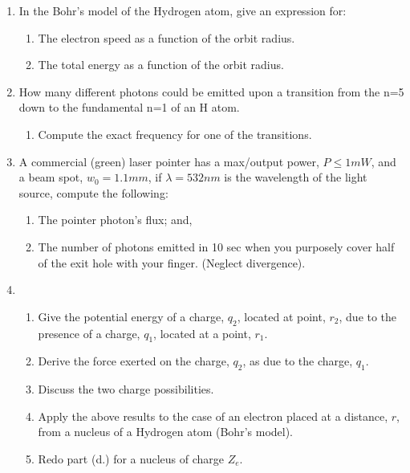 \documentclass[colorlinks,11pt,a4paper,normalphoto,withhyper,ragged2e]{altareport}
\begin{document}
	\begin{enumerate}[leftmargin=1cm]
		\item In the Bohr’s model of the Hydrogen atom, give an expression for: \\
		
		\begin{enumerate}
			\item The electron speed as a function of the orbit radius. \\
			\item The total energy as a function of the orbit radius. \\
		\end{enumerate}
		
		
		\item How many different photons could be emitted upon a transition from the n=5 down to the fundamental n=1 of an H atom. \\
		
		\begin{enumerate}
			\item Compute the exact frequency for one of the transitions. \\
		\end{enumerate}
		
		
		\item A commercial (green) laser pointer has a max/output power, $P \leq 1mW$, and a beam spot, $w_0 = 1.1mm$, if $\lambda = 532nm$ is the wavelength of the light source, compute the following: \\
		
		\begin{enumerate}
			\item The pointer photon’s flux; and,   \\
			\item The number of photons emitted in 10 sec when you purposely cover half of the exit hole with your finger. (Neglect divergence). \\
		\end{enumerate}
		
		
		\item
		\begin{enumerate}
			\item Give the potential energy of a charge, $q_2$, located at point, $r_2$, due to the presence of a charge, $q_1$, located at a point, $r_1$. \\
			\item Derive the force exerted on the charge, $q_2$, as due to the charge, $q_1$. \\
			\item Discuss the two charge possibilities. \\
			\item Apply the above results to the case of an electron placed at a distance, $r$, from a nucleus of a Hydrogen atom (Bohr’s model). \\
			\item Redo part (d.) for a nucleus of charge $Z_e$. \\
		\end{enumerate}
		

\end{enumerate}
\end{document}
